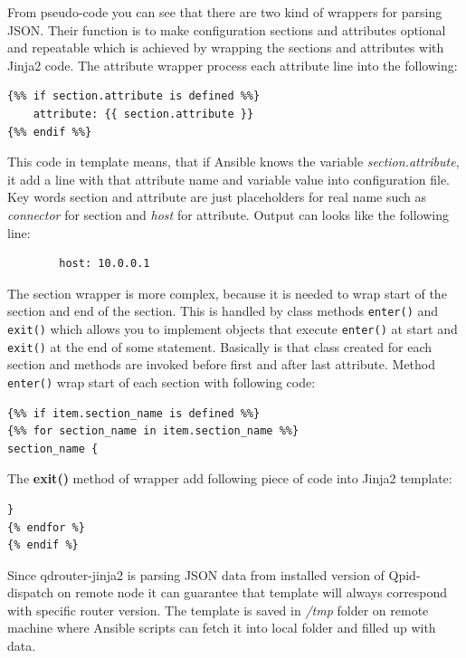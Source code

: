 From pseudo-code you can see that there are two kind of wrappers for parsing JSON. Their function is to make configuration sections and attributes optional and repeatable which is achieved by wrapping the sections and attributes with Jinja2 code. The attribute wrapper process each attribute line into the following:

\begin{verbatim}
{%% if section.attribute is defined %%}
    attribute: {{ section.attribute }}
{%% endif %%}
\end{verbatim}

This code in template means, that if Ansible knows the variable \emph{section.attribute}, it add a line with that attribute name and variable value into configuration file. Key words section and attribute are just placeholders for real name such as \emph{connector} for section and \emph{host} for attribute. Output can looks like the following line:

\begin{verbatim}
		host: 10.0.0.1
\end{verbatim}

The section wrapper is more complex, because it is needed to wrap start of the section and end of the section. This is handled by class methods \texttt{\textunderscore enter\textunderscore ()} and \texttt{\textunderscore exit\textunderscore ()} which allows you to implement objects that execute \texttt{\textunderscore enter\textunderscore ()} at start and \texttt{\textunderscore exit\textunderscore ()} at the end of some statement. Basically is that class created for each section and methods are invoked before first and after last attribute. Method \texttt{\textunderscore enter\textunderscore ()} wrap start of each section with following code:

\begin{verbatim}
{%% if item.section_name is defined %%}
{%% for section_name in item.section_name %%}
section_name {
\end{verbatim}

The \textbf{\textunderscore exit\textunderscore ()} method of wrapper add following piece of code into Jinja2 template:
\begin{verbatim}
}
{% endfor %}
{% endif %}
\end{verbatim}

Since qdrouter-jinja2 is parsing JSON data from installed version of Qpid-dispatch on remote node it can guarantee that template will always correspond with specific router version. The template is saved in \emph{/tmp} folder on remote machine where Ansible scripts can fetch it into local folder and filled up with data.

